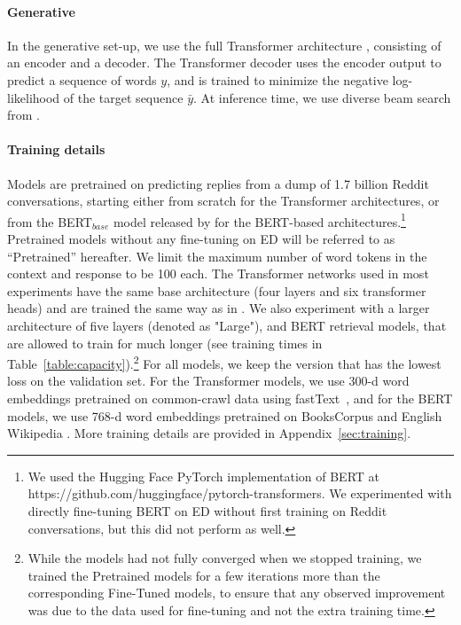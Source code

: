 \documentclass[11pt,a4paper]{article}
\begin{document}
\paragraph{Generative} In the generative set-up, we use the full Transformer architecture \citep{TransformerNets}, consisting of
an encoder and a decoder.
The Transformer decoder uses the encoder output to predict a sequence of words $y$, and is trained to minimize the negative log-likelihood of
the target sequence $\bar{y}$. At inference time, we use diverse beam search from \citet{DiverseBS}.

\paragraph{Training details} Models are pretrained on predicting replies from a dump of 1.7 billion Reddit conversations, starting either from scratch for the Transformer architectures, or from the BERT$_{base}$ model released by \citet{bertppr} for the BERT-based architectures.\footnote{We used the Hugging Face PyTorch implementation of BERT at https://github.com/huggingface/pytorch-transformers. We experimented with directly fine-tuning BERT on ED without first training on Reddit conversations, but this did not perform as well.} Pretrained models without any fine-tuning on ED will be referred to as ``Pretrained'' hereafter.  
We
limit the maximum number of word tokens in the context and response to be 100 each.
The Transformer networks used in most experiments have the same base architecture (four layers and six transformer heads) and are trained the same way as in \citet{mazare2018training}. We also experiment with a larger architecture of five layers (denoted as "Large"), and BERT retrieval models, that are allowed to train for much longer (see training times in Table~\ref{table:capacity}).\footnote{While the models had not fully converged when we stopped training, we trained the Pretrained models for a few iterations more than the corresponding Fine-Tuned models, to ensure that any observed improvement was due to the data used for fine-tuning and not
the extra training time.}
For all models, we keep the version that has the lowest loss on the validation set.  For the Transformer models, we use 300-d word embeddings pretrained on common-crawl data using fastText~\citep{grave2018learning}, and for the BERT models, we use 768-d word embeddings pretrained on BooksCorpus and English Wikipedia \citep{bertppr}. More training details are provided in Appendix~\ref{sec:training}.
\end{document}
